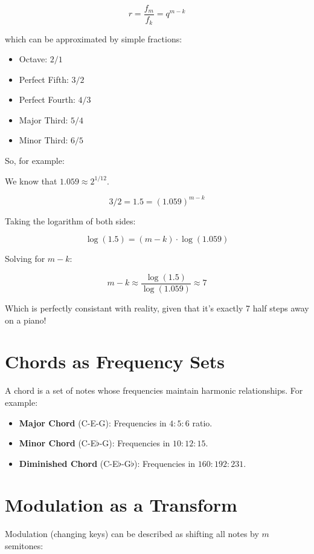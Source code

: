 \documentclass{article}
\begin{document}
\begin{equation}
    r = \frac{f_m}{f_k} = q^{m-k}
\end{equation}

which can be approximated by simple fractions:

\begin{itemize}
    \item Octave: $2/1$
    \item Perfect Fifth: $3/2$
    \item Perfect Fourth: $4/3$
    \item Major Third: $5/4$
    \item Minor Third: $6/5$
\end{itemize}

So, for example:

We know that \( 1.059 \approx 2^{1/12} \).

\[
3/2 = 1.5 = (1.059)^{m-k}
\]

Taking the logarithm of both sides:

\[
\log(1.5) = (m-k) \cdot \log(1.059)
\]

Solving for \( m-k \):

\[
m-k \approx \frac{\log(1.5)}{\log(1.059)} \approx 7
\]
 
Which is perfectly consistant with reality, given that it's exactly 7 half steps away on a piano!


\section{Chords as Frequency Sets}
A chord is a set of notes whose frequencies maintain harmonic relationships. For example:

\begin{itemize}
    \item \textbf{Major Chord} (C-E-G): Frequencies in $4:5:6$ ratio.
    \item \textbf{Minor Chord} (C-E$\flat$-G): Frequencies in $10:12:15$.
    \item \textbf{Diminished Chord} (C-E$\flat$-G$\flat$): Frequencies in $160:192:231$.
\end{itemize}

\section{Modulation as a Transform}
Modulation (changing keys) can be described as shifting all notes by $m$ semitones:
\end{document}
